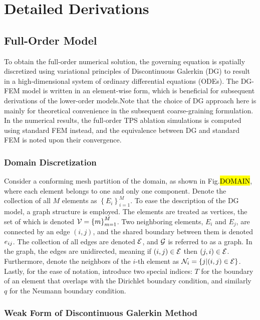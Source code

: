 \appendix

\section{Detailed Derivations}\label{appendix_derivations}

\subsection{Full-Order Model}

To obtain the full-order numerical solution, the governing equation is spatially discretized using variational principles of Discontinuous Galerkin (DG) to result in a high-dimensional system of ordinary differential equations (ODEs). The DG-FEM model is written in an element-wise form, which is beneficial for subsequent derivations of the lower-order models.Note that the choice of DG approach here is mainly for theoretical convenience in the subsequent coarse-graining formulation. In the numerical results, the full-order TPS ablation simulations is computed using standard FEM instead, and the equivalence between DG and standard FEM is noted upon their convergence.

\subsubsection{Domain Discretization}

Consider a conforming mesh partition of the domain, as shown in Fig.\hl{DOMAIN}, where each element belongs to one and only one component. Denote the collection of all $M$ elements as $\left\{E_i\right\}_{i=1}^{M}$. To ease the description of the DG model, a graph structure is employed. The elements are treated as vertices, the set of which is denoted $\mathcal{V}=\left\{m\right\}_{m=1}^{M}$. Two neighboring elements, $E_i$ and $E_j$, are connected by an edge $(i,j)$, and the shared boundary between them is denoted $e_{ij}$. The collection of all edges are denoted $\mathcal{E}$, and $\mathcal{G}$ is referred to as a graph. In the graph, the edges are unidirected, meaning if $(i,j)\in\mathcal{E}$ then $(j,i)\in\mathcal{E}$. Furthermore, denote the neighbors of the $i$-th element as $\mathcal{N}_i=\left\{j | (i,j) \in\mathcal{E}\right\}$. Lastly, for the ease of notation, introduce two special indices: $T$ for the boundary of an element that overlaps with the Dirichlet boundary condition, and similarly $q$ for the Neumann boundary condition.

\subsubsection{Weak Form of Discontinuous Galerkin Method}

